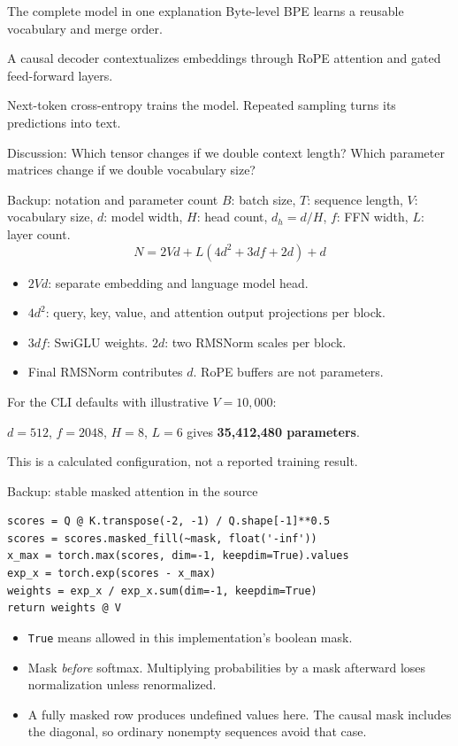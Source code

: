 \documentclass[11pt,aspectratio=169]{beamer}
\begin{document}
\begin{frame}{The complete model in one explanation}
\large
Byte-level BPE learns a reusable vocabulary and merge order.\par\par\vspace{3mm}
A causal decoder contextualizes embeddings through RoPE attention and gated feed-forward layers.\par\par\vspace{3mm}
Next-token cross-entropy trains the model. Repeated sampling turns its predictions into text.
\par\vspace{5mm}
\normalsize\alert{Discussion:} Which tensor changes if we double context length? Which parameter matrices change if we double vocabulary size?
\end{frame}

\appendix
\begin{frame}{Backup: notation and parameter count}
\small
$B$: batch size, $T$: sequence length, $V$: vocabulary size, $d$: model width, $H$: head count, $d_h=d/H$, $f$: FFN width, $L$: layer count.
\[
N=2Vd+L(4d^2+3df+2d)+d
\]
\begin{itemize}
\item $2Vd$: separate embedding and language model head.
\item $4d^2$: query, key, value, and attention output projections per block.
\item $3df$: SwiGLU weights. $2d$: two RMSNorm scales per block.
\item Final RMSNorm contributes $d$. RoPE buffers are not parameters.
\end{itemize}
For the CLI defaults with illustrative $V=10{,}000$:\par
$d=512$, $f=2048$, $H=8$, $L=6$ gives \textbf{35,412,480 parameters}.\par
This is a calculated configuration, not a reported training result.
\end{frame}

\begin{frame}[fragile]{Backup: stable masked attention in the source}
\begin{lstlisting}
scores = Q @ K.transpose(-2, -1) / Q.shape[-1]**0.5
scores = scores.masked_fill(~mask, float('-inf'))
x_max = torch.max(scores, dim=-1, keepdim=True).values
exp_x = torch.exp(scores - x_max)
weights = exp_x / exp_x.sum(dim=-1, keepdim=True)
return weights @ V
\end{lstlisting}
\begin{itemize}
\item \texttt{True} means allowed in this implementation's boolean mask.
\item Mask \emph{before} softmax. Multiplying probabilities by a mask afterward loses normalization unless renormalized.
\item A fully masked row produces undefined values here. The causal mask includes the diagonal, so ordinary nonempty sequences avoid that case.
\end{itemize}
\end{frame}
\end{document}
